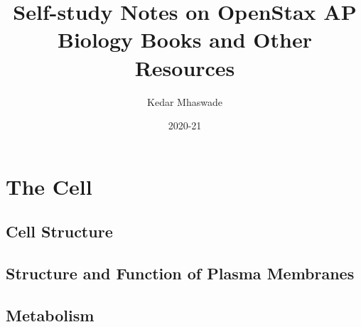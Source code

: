 \documentclass[12pt]{article}
\begin{document}
\title{Self-study Notes on OpenStax AP Biology Books and Other Resources}
\author{Kedar Mhaswade}
\date{2020-21}
\maketitle
\def\dev{\edef~{\string~}\textmarathi}
\section{The Cell}
\subsection{Cell Structure}
\subsection{Structure and Function of Plasma Membranes}
\subsection{Metabolism}
\end{document}
